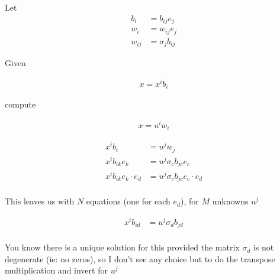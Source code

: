 \documentclass{article}      %
\begin{document}
%

Let
\begin{align*}
b_i &= b_{ij} e_j \\
w_i &= w_{ij} e_j \\
w_{ij} &= \sigma_j b_{ij}
\end{align*}

Given

\begin{align*}
x = x^i b_i
\end{align*}

compute

\begin{align*}
x = u^i w_i
\end{align*}

\begin{align*}
x^i b_i &= u^j w_j \\
x^i b_{ik} e_k &= u^j \sigma_c b_{jc} e_c \\
x^i b_{ik} e_k \cdot e_d &= u^j \sigma_c b_{jc} e_c \cdot e_d \\
\end{align*}

This leaves us with $N$ equations (one for each $e_d$), for $M$ unknowns $u^j$

\begin{align*}
x^i b_{id} &= u^j \sigma_d b_{jd} \\
\end{align*}

You know there is a unique solution for this provided the matrix $\sigma_d$ is not degenerate (ie: no zeros), so I don't see any choice but to do the transpose multiplication and invert for $u^j$

\end{document}
